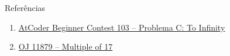 \begin{frame}[fragile]{Referências}

    \begin{enumerate}
        \item \href{https://atcoder.jp/contests/abc106/tasks/abc106_c}{AtCoder Beginner Contest 103 -- Problema C: To Infinity}

        \item \href{https://onlinejudge.org/index.php?option=com_onlinejudge&Itemid=8&category=24&page=show_problem&problem=3001}{OJ 11879 -- Multiple of 17}
    \end{enumerate}

\end{frame}
